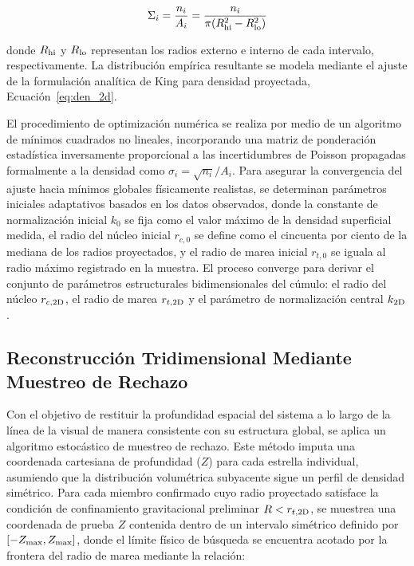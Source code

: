         $$\Sigma_i = \frac{n_i}{A_i} = \frac{n_i}{\pi(R_{\rm hi}^2 - R_{\rm lo}^2)}$$ 
        
        donde $R_{\rm hi}$ y $R_{\rm lo}$ representan los radios externo e 
        interno de cada intervalo, respectivamente. La distribución empírica 
        resultante se modela mediante el ajuste de la formulación analítica de 
        King para densidad proyectada, Ecuación~\eqref{eq:den_2d}.

        El procedimiento de optimización numérica se realiza por medio de un 
        algoritmo de mínimos cuadrados no lineales, incorporando una matriz de 
        ponderación estadística inversamente proporcional a las incertidumbres 
        de Poisson propagadas formalmente a la densidad como 
        $\sigma_i = \sqrt{n_i}/A_i$. Para asegurar la convergencia del ajuste 
        hacia mínimos globales físicamente realistas, se determinan parámetros 
        iniciales adaptativos basados en los datos observados, donde la 
        constante de normalización inicial $k_0$ se fija como el valor máximo de 
        la densidad superficial medida, el radio del núcleo inicial $r_{c,0}$ se 
        define como el cincuenta por ciento de la mediana de los radios 
        proyectados, y el radio de marea inicial $r_{t,0}$ se iguala al radio 
        máximo registrado en la muestra. El proceso converge para derivar el 
        conjunto de parámetros estructurales bidimensionales del cúmulo: el 
        radio del núcleo $r_{c,\rm 2D}$, el radio de marea $r_{t,\rm 2D}$ y el 
        parámetro de normalización central $k_{\rm 2D}$.

    \subsection{Reconstrucción Tridimensional Mediante Muestreo de Rechazo} 
        Con el objetivo de restituir la profundidad espacial del sistema a lo 
        largo de la línea de la visual de manera consistente con su estructura 
        global, se aplica un algoritmo estocástico de muestreo de rechazo. Este 
        método imputa una coordenada cartesiana de profundidad ($Z$) para cada 
        estrella individual, asumiendo que la distribución volumétrica 
        subyacente sigue un perfil de densidad simétrico. Para cada miembro 
        confirmado cuyo radio proyectado satisface la condición de confinamiento 
        gravitacional preliminar $R < r_{t,\rm 2D}$, se muestrea una coordenada 
        de prueba $Z$ contenida dentro de un intervalo simétrico definido por 
        $[-Z_{\rm max}, Z_{\rm max}]$, donde el límite físico de búsqueda se 
        encuentra acotado por la frontera del radio de marea mediante la 
        relación: 
        
